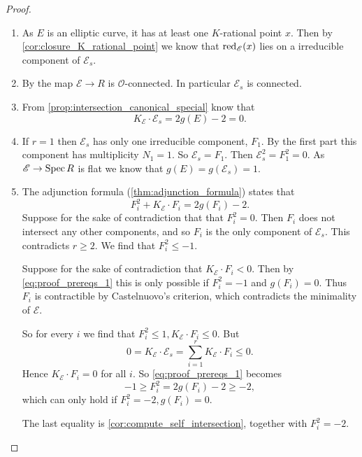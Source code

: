 \begin{proof}
\begin{enumerate}
	\item As $E$ is an elliptic curve, it has at least one $K$-rational point $x$.
		Then by \cref{cor:closure_K_rational_point} we know that  $\operatorname{red}_{\mathscr E}(x)$ lies on a irreducible component of $\mathscr E_s$. 
	\item By \cite[cor.\ 9.1.24]{liuAlgebraicGeometryArithmetic2002} the map $\mathscr E \to R$ is $\mathcal{O}$-connected. 
		In particular  $\mathscr E_s$ is connected. 
	\item From \cref{prop:intersection_canonical_special} know that \[
			K_{\mathscr E} \cdot \mathscr E_{s} = 2g(E) - 2 = 0
	.\]  
	\item If $r = 1$ then $\mathscr E_s$ has only one irreducible component, $F_1$. 
		By the first part this component has multiplicity $N_1 = 1$. 
		So $\mathscr E_s = F_1$. 
		Then $\mathscr E_s^2 = F_1^2 = 0$. 
		As $\mathscr E \to \operatorname{Spec} R$ is flat we know that $g(E)  = g(\mathscr E_s) = 1$.
	\item 	
		The adjunction formula (\cref{thm:adjunction_formula}) states that \begin{equation}\label{eq:proof_prereqs_1}
			F_i^2 + K_{\mathscr E} \cdot F_i = 2g(F_i) - 2
		.\end{equation}
		Suppose for the sake of contradiction that that $F_i^2 = 0$. 
		Then $F_i$ does not intersect any other components, and so $F_i$ is the only component of $\mathscr E_s$. 
		This contradicts $r \ge 2$. 
		We find that $F_i^2 \le -1$. 
		
		Suppose for the sake of contradiction that $K_\mathscr E \cdot F_i < 0$. 
		Then by \eqref{eq:proof_prereqs_1} this is only possible if $F_i^2 = -1$ and $g(F_i) =0$. 
		Thus $F_i$ is contractible by Castelnuovo's criterion, which contradicts the minimality of $\mathscr E$. 

		So for every $i$ we find that $F_i^2 \le 1, K_{\mathscr E} \cdot F_i \le 0$. 
		But \[
		0 = K_{\mathscr E} \cdot \mathscr E_s = \sum_{i = 1}^{r} K_{\mathscr E} \cdot F_i \le 0
		.\]  
		Hence  $K_{\mathscr E} \cdot F_i = 0$ for all $i$. 
		So \eqref{eq:proof_prereqs_1} becomes \[
			-1 \ge  F^2_i = 2g(F_i) - 2 \ge -2
		,\]  
		which can only hold if $F_i^2 = -2, g(F_i) = 0$. 

		The last equality is \cref{cor:compute_self_intersection}, together with $F_i^2 = -2$. 
\end{enumerate}	
\end{proof}

